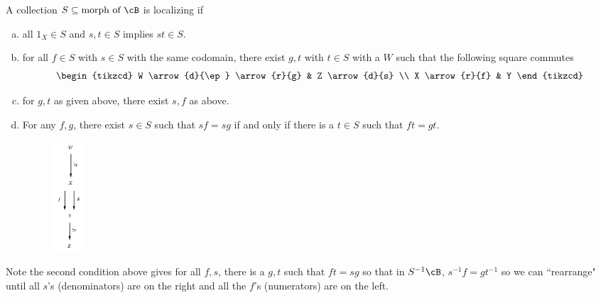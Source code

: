\begin{dfn}
A collection $S \subseteq \text{morph of }\cB$ is localizing if
\begin{enumerate}[(a)]
\item all $1_X \in S$ and $s,t \in S$ implies $st \in S$.
\item for all $f \in S$ with $s \in S$ with the same codomain, there exist $g,t$ with $t \in S$ with a $W$ such that the following square commutes
\[
\begin{tikzcd}
W \arrow{d}{\ep} \arrow{r}{g} & Z \arrow{d}{s} \\
X \arrow{r}{f} & Y 
\end{tikzcd}
\]
\item for $g,t$ as given above, there exist $s,f$ as above.
\item For any $f,g$, there exist $s \in S$ such that $sf=sg$ if and only if there is a $t \in S$ such that $ft=gt$.

\begin{figure}[H] 
   \centering
   \includegraphics[width=0.5in]{images/p1.png} 
\end{figure}

\end{enumerate}
\end{dfn}

Note the second condition above gives for all $f,s$, there is a $g,t$ such that $ft=sg$ so that in $S^{-1}\cB$, $s^{-1}f=gt^{-1}$ so we can ``rearrange" until all $s$'s (denominators) are on the right and all the $f$'s (numerators) are on the left.

